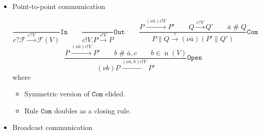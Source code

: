 \documentclass{article}
\newcommand{\pOut}{{!}}
\newcommand{\pInp}{{?}}
\newcommand{\new}[2]{(\nu\!#1) #2}
\newcommand{\freshFor}{\mathrel{\#}}
\DeclareMathOperator{\n}{n}
\begin{document}
\begin{itemize}

\item Point-to-point communication

\begin{equation*}
%
%
\frac{
}{
c \pInp \mathcal{F} \xrightarrow{c \pInp V} \mathcal{F}(V)
}
\mathtt{In}
%
\qquad
%
%
\frac{
}{
c \pOut V. P \xrightarrow{c \pOut V} P
}
\mathtt{Out}
%
\qquad
%
\frac{
P \xrightarrow{\new{\bar{a}}{c \pOut V}} P' \qquad
Q \xrightarrow{c \pInp V} Q' \qquad
\bar{a} \freshFor Q
}{
P \parallel Q \xrightarrow{\tau} \new{\bar{a}}{(P' \parallel Q')}
}
\mathtt{Com}
%
\end{equation*}
%
\begin{equation*}
\frac{
P \xrightarrow{\new{\bar{a}}{c \pOut V}} P' \qquad
b \freshFor \bar{a}, c \qquad
b \in \n(V)
}{
\new{b}{P} \xrightarrow{\new{\bar{a},b}{c \pOut V}} P'
}
\mathtt{Open}
\end{equation*}
%
where
%
\begin{itemize}
\item Symmetric version of $\mathtt{Com}$ elided.
\item Rule $\mathtt{Com}$ doubles as a closing rule.
\end{itemize}


\item Broadcast communication


\end{itemize}
\end{document}
